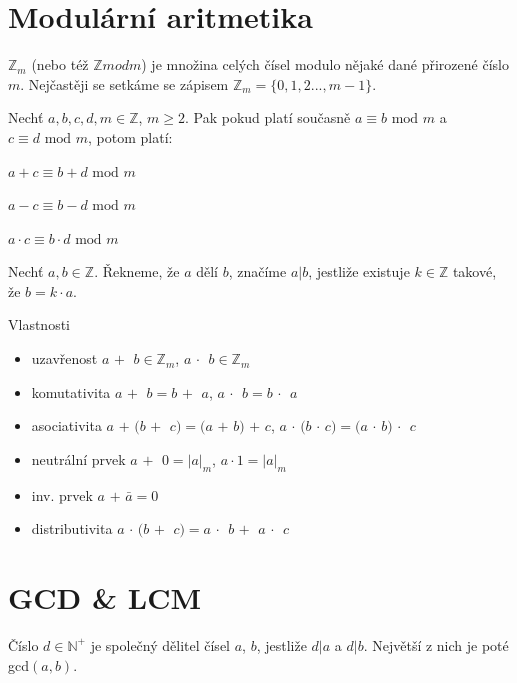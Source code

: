 \documentclass{szzclass}
\begin{document}
\tableofcontents
\newpage

\section{Modulární aritmetika}
$\mathbb{Z}_m$ (nebo též $\mathbb{Z} mod m$) je množina celých čísel modulo nějaké dané přirozené číslo $m$. Nejčastěji se
setkáme se zápisem $\mathbb{Z}_m = \{0, 1, 2 . . . , m - 1\}$.

Nechť $a, b, c, d, m \in \mathbb{Z}$, $m \geq 2$. Pak pokud platí současně $a \equiv b \text{ mod } m$ a $c \equiv d \text{ mod } m$, potom platí:

\begin{center}
$a + c \equiv b + d \text{ mod } m$

$a - c \equiv b - d \text{ mod } m$

$a \cdot c \equiv b \cdot d \text{ mod } m$
\end{center}

Nechť $a, b \in \mathbb{Z}$. Řekneme, že $a$ dělí $b$, značíme $a|b$, jestliže
existuje $k \in \mathbb{Z}$ takové, že $b = k \cdot a$.

Vlastnosti
\begin{itemize}
    \item uzavřenost $a$ \textcircled{$+$} $b \in \mathbb{Z}_m$, $a$ \textcircled{$\cdot$} $b \in \mathbb{Z}_m$
    \item komutativita $a$ \textcircled{$+$} $b = b$ \textcircled{$+$} $a$, $a$ \textcircled{$\cdot$} $b = b$ \textcircled{$\cdot$} $a$
    \item asociativita $a$ \textcircled{$+$} $(b$ \textcircled{$+$} $c) = (a$ \textcircled{$+$} $b)$ \textcircled{$+$} $c$,
    $a$ \textcircled{$\cdot$} $(b$ \textcircled{$\cdot$} $c) = (a$ \textcircled{$\cdot$} $b)$ \textcircled{$\cdot$} $c$
    \item neutrální prvek $a$ \textcircled{$+$} $0 = |a|_m$, $a \cdot 1 = |a|_m$
    \item inv. prvek $a$ \textcircled{$+$} $\bar{a} = 0$
    \item distributivita $a$ \textcircled{$\cdot$} $(b$ \textcircled{$+$} $c) = a$ \textcircled{$\cdot$} $b$ \textcircled{$+$} $a$ \textcircled{$\cdot$} $c$
\end{itemize}

\newpage

\section{GCD \& LCM}
Číslo $d \in \mathbb{N}^+$ je společný dělitel čísel $a$, $b$, jestliže $d|a$ a $d|b$. Největší z nich je poté gcd$(a,b)$.
\end{document}
